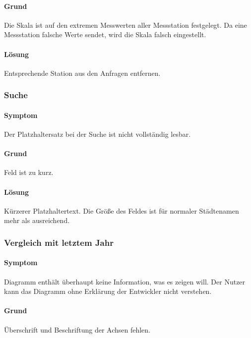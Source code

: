       \paragraph{Grund}
      Die Skala ist auf den extremen Messwerten aller Messstation festgelegt. Da eine Messstation falsche Werte sendet, wird die Skala falsch eingestellt.

      \paragraph{Lösung}
      Entsprechende Station aus den Anfragen entfernen.

    \subsubsection*{Suche}
      \paragraph{Symptom}
      Der Platzhaltersatz bei der Suche ist nicht vollständig lesbar.

      \paragraph{Grund}
      Feld  ist zu kurz.

      \paragraph{Lösung}
      Kürzerer Platzhaltertext. Die Größe des Feldes ist für normaler Städtenamen mehr als ausreichend.

    \subsubsection*{Vergleich mit letztem Jahr}
      \paragraph{Symptom}

      Diagramm enthält überhaupt keine Information, was es zeigen will. Der Nutzer kann das Diagramm ohne Erklärung der Entwickler nicht verstehen.


      \paragraph{Grund}
      Überschrift und Beschriftung der Achsen fehlen.


